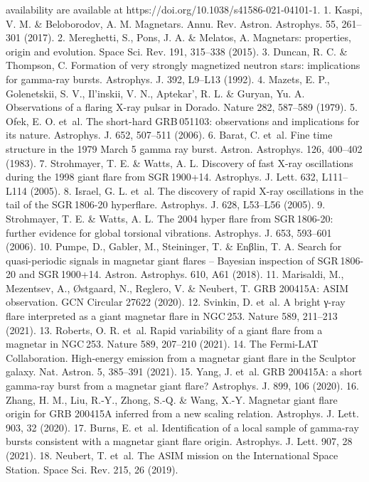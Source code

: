 availability are available at https://doi.org/10.1038/s41586-021-04101-1.
1.
Kaspi, V. M. \& Beloborodov, A. M. Magnetars. Annu. Rev. Astron. Astrophys. 55, 261–301 (2017).
2.
Mereghetti, S., Pons, J. A. \& Melatos, A. Magnetars: properties, origin and evolution.
Space Sci. Rev. 191, 315–338 (2015).
3.
Duncan, R. C. \& Thompson, C. Formation of very strongly magnetized neutron stars:
implications for gamma-ray bursts. Astrophys. J. 392, L9–L13 (1992).
4.
Mazets, E. P., Golenetskii, S. V., Il’inskii, V. N., Aptekar’, R. L. \& Guryan, Yu. A. Observations
of a flaring X-ray pulsar in Dorado. Nature 282, 587–589 (1979).
5.
Ofek, E. O. et al. The short-hard GRB 051103: observations and implications for its nature.
Astrophys. J. 652, 507–511 (2006).
6.
Barat, C. et al. Fine time structure in the 1979 March 5 gamma ray burst. Astron. Astrophys.
126, 400–402 (1983).
7.
Strohmayer, T. E. \& Watts, A. L. Discovery of fast X-ray oscillations during the 1998 giant
flare from SGR 1900+14. Astrophys. J. Lett. 632, L111–L114 (2005).
8.
Israel, G. L. et al. The discovery of rapid X-ray oscillations in the tail of the SGR 1806-20
hyperflare. Astrophys. J. 628, L53–L56 (2005).
9.
Strohmayer, T. E. \& Watts, A. L. The 2004 hyper flare from SGR 1806-20: further evidence
for global torsional vibrations. Astrophys. J. 653, 593–601 (2006).
10.
Pumpe, D., Gabler, M., Steininger, T. \& Enβlin, T. A. Search for quasi-periodic signals in
magnetar giant flares – Bayesian inspection of SGR 1806-20 and SGR 1900+14. Astron.
Astrophys. 610, A61 (2018).
11.
Marisaldi, M., Mezentsev, A., Østgaard, N., Reglero, V. \& Neubert, T. GRB 200415A: ASIM
observation. GCN Circular 27622 (2020).
12.
Svinkin, D. et al. A bright γ-ray flare interpreted as a giant magnetar flare in NGC 253.
Nature 589, 211–213 (2021).
13.
Roberts, O. R. et al. Rapid variability of a giant flare from a magnetar in NGC 253. Nature
589, 207–210 (2021).
14.
The Fermi-LAT Collaboration. High-energy emission from a magnetar giant flare in the
Sculptor galaxy. Nat. Astron. 5, 385–391 (2021).
15.
Yang, J. et al. GRB 200415A: a short gamma-ray burst from a magnetar giant flare?
Astrophys. J. 899, 106 (2020).
16.
Zhang, H. M., Liu, R.-Y., Zhong, S.-Q. \& Wang, X.-Y. Magnetar giant flare origin for GRB
200415A inferred from a new scaling relation. Astrophys. J. Lett. 903, 32 (2020).
17.
Burns, E. et al. Identification of a local sample of gamma-ray bursts consistent with a
magnetar giant flare origin. Astrophys. J. Lett. 907, 28 (2021).
18.
Neubert, T. et al. The ASIM mission on the International Space Station. Space Sci. Rev.
215, 26 (2019).
